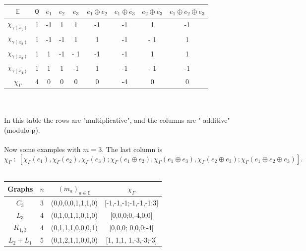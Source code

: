 \documentclass[preprint,12pt,authoryear]{elsarticle}
\theoremstyle{definition}
\begin{document}
\begin{center}
\renewcommand{\arraystretch}{1.2}
\begin{tabular}{|c|c|c|c|c|c|c|c|c|}
\hline
$\mathbb{E}$       & 0  & $e_1$ & $e_2$ & $e_3$ & $e_1\oplus e_2$  &  $e_1\oplus e_3$ &  $e_2\oplus e_3$ &  $e_1\oplus e_2 \oplus e_3$ \\
\hline
$\chi_{\gamma(x_1)} $ &1  & -1     & 1          &   1     &       -1                    &           -1               &             1              &              -1 \\
\hline
$\chi_{\gamma(x_2)} $ &1  & -1     & -1          &   1     &       1                    &           -1               &            - 1              &              1 \\
\hline
$\chi_{\gamma(x_3)} $ &1  & 1     &  -1          &  - 1     &       -1                    &           -1               &             1              &              1 \\
\hline
$\chi_{\gamma(x_4)} $ &1  & 1     & 1          &   -1     &       1                    &           -1               &            - 1              &              -1 \\
\hline
$\chi_{\Gamma} $ &4  & 0     & 0         &   0    &       0                    &           -4               &             0              &              0 \\
\hline
\end{tabular}
\end{center}\mbox{}\\\\
In this table  the rows  are "multiplicative", and the columns are " additive" (modulo p). \\\\
Now some examples with $m=3$. The last column is 
$$ \chi_{\Gamma}\;:\; [\chi_{\Gamma}(e_1), \chi_{\Gamma}(e_2), \chi_{\Gamma}(e_3); \chi_{\Gamma}(e_1\oplus e_2), 
\chi_{\Gamma}(e_1\oplus e_3), \chi_{\Gamma}( e_2 \oplus e_3); \chi_{\Gamma}(e_1\oplus e_2 \oplus e_3)].
$$ \\
\begin{center}
\renewcommand{\arraystretch}{1.4}
\begin{tabular}{|c|c|c|c|}
\hline
Graphs      & $n$    & $(m_a)_{a \in \mathbb{E}}$   &  $\chi_{\Gamma}$ \\ 
\hline
$C_3$       & 3    & (0,0,0,0,1,1,1,0)                      & [-1,-1,-1;-1,-1,-1;3]\\
\hline
$L_3$        &  4  & (0,1,0,1,1,0,1,0)                      & [0,0,0;0,-4,0;0]      \\
\hline
$K_{1,3}$   & 4  & (0,1,1,1,0,0,0,1)                      & [0,0,0; 0,0,0;-4]       \\
\hline
$L_2+L_1$  & 5  & (0,1,2,1,1,0,0,0)                     & [1, 1,1,  1,-3,-3;-3]      \\
\hline
\end{tabular}
\end{center}\mbox{}\\\\
\end{document}
